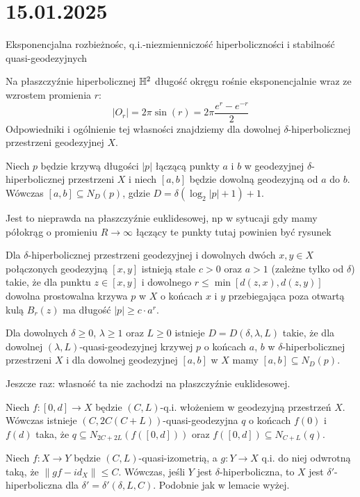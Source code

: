 \section{15.01.2025}{Eksponencjalna rozbieżnośc, q.i.-niezmienniczość hiperboliczności i stabilność quasi-geodezyjnych}

Na płaszczyźnie hiperbolicznej $\mathbb{H}^2$ długość okręgu rośnie eksponencjalnie wraz ze wzrostem promienia $r$:
$$|O_r|=2\pi\sin(r)=2\pi \frac{e^r-e^{-r}}{2}$$
Odpowiedniki i ogólnienie tej własności znajdziemy dla dowolnej $\delta$-hiperbolicznej przestrzeni geodezyjnej $X$.

\begin{lemma}{}{}
  Niech $p$ będzie krzywą długości $|p|$ łączącą punkty $a$ i $b$ w geodezyjnej $\delta$-hiperbolicznej przestrzeni $X$ i niech $[a,b]$ będzie dowolną geodezyjną od $a$ do $b$. Wówczas $[a,b]\subseteq N_D(p)$, gdzie $D=\delta(\log_2|p|+1)+1$.
\end{lemma}

Jest to nieprawda na płaszczyźnie euklidesowej, np w sytucaji gdy mamy półokrąg o promieniu $R\to\infty$ łączący te punkty
{\color{red}tutaj powinien być rysunek}

\begin{conclusion}{}{}
Dla $\delta$-hiperbolicznej przestrzeni geodezyjnej i dowolnych dwóch $x,y\in X$ połączonych geodezyjną $[x,y]$ istnieją stałe $c>0$ oraz $a>1$ (zależne tylko od $\delta$) takie, że dla punktu $z\in[x,y]$ i dowolnego $r\leq \min[d(z,x),d(z,y)]$ dowolna prostowalna krzywa $p$ w $X$ o końcach $x$ i $y$ przebiegająca poza otwartą kulą $B_r(z)$ ma długość $|p|\geq c\cdot a^r$. 
\end{conclusion}

\begin{lemma}{}{}
  Dla dowolnych $\delta\geq0$, $\lambda\geq1$ oraz $L\geq0$ istnieje $D=D(\delta, \lambda,L)$ takie, że dla dowolnej $(\lambda,L)$-quasi-geodezyjnej krzywej $p$ o końcach $a$, $b$ w $\delta$-hiperbolicznej przestrzeni $X$ i dla dowolnej geodezyjnej $[a,b]$ w $X$ mamy $[a,b]\subseteq N_D(p)$.
\end{lemma}

Jeszcze raz: własność ta nie zachodzi na płaszczyźnie euklidesowej.

\begin{lemma}{}{}
  Niech $f:[0,d]\to X$ będzie $(C,L)$-q.i. włożeniem w geodezyjną przestrzeń $X$. Wówczas istnieje $(C, 2C(C+L))$-quasi-geodezyjna $q$ o końcach $f(0)$ i $f(d)$ taka, że $q\subseteq N_{2C+2L}(f([0,d]))$ oraz $f([0,d])\subseteq N_{C+L}(q)$.
\end{lemma}

\begin{theorem}{}{}
  Niech $f:X\to Y$ będzie $(C,L)$-quasi-izometrią, a $g:Y\to X$ q.i. do niej odwrotną taką, że $\|gf-id_X\|\leq C$. Wówczas, jeśli $Y$ jest $\delta$-hiperboliczna, to $X$ jest $\delta'$-hiperboliczna dla $\delta'=\delta'(\delta, L, C)$. Podobnie jak w lemacie wyżej.
\end{theorem}




